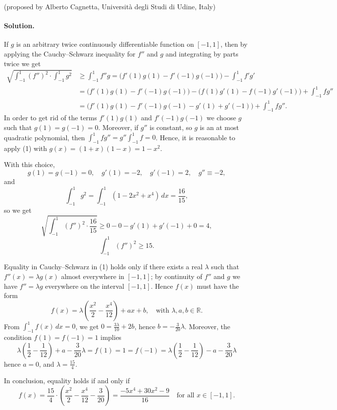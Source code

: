 \documentclass{article}
\begin{document}
(proposed by Alberto Cagnetta, Universit\`a degli Studi di Udine, Italy)

\paragraph{Solution.}
If $g$ is an arbitrary twice continuously differentiable function on $[-1,1]$, then by applying the Cauchy--Schwarz inequality for $f''$ and $g$ and integrating by parts twice we get
\begin{align*}
\sqrt{\int_{-1}^{1} (f'')^2 \cdot \int_{-1}^{1} g^2} &\geq \int_{-1}^{1} f'' g = \bigl(f'(1)g(1) - f'(-1)g(-1)\bigr) - \int_{-1}^{1} f' g' \\
&= \bigl(f'(1)g(1) - f'(-1)g(-1)\bigr) - \bigl(f(1)g'(1) - f(-1)g'(-1)\bigr) + \int_{-1}^{1} f g'' \\
&= \bigl(f'(1)g(1) - f'(-1)g(-1) - g'(1) + g'(-1)\bigr) + \int_{-1}^{1} f g''. \tag{1}
\end{align*}
In order to get rid of the terms $f'(1)g(1)$ and $f'(-1)g(-1)$ we choose $g$ such that $g(1) = g(-1) = 0$. Moreover, if $g''$ is constant, so $g$ is an at most quadratic polynomial, then $\int_{-1}^{1} f g'' = g'' \int_{-1}^{1} f = 0$.
Hence, it is reasonable to apply (1) with $g(x) = (1+x)(1-x) = 1 - x^2$.

With this choice,
\[
g(1) = g(-1) = 0, \quad g'(1) = -2, \quad g'(-1) = 2, \quad g'' \equiv -2,
\]
and
\[
\int_{-1}^{1} g^2 = \int_{-1}^{1} (1 - 2x^2 + x^4)\, dx = \frac{16}{15},
\]
so we get
\[
\sqrt{\int_{-1}^{1} (f'')^2 \cdot \frac{16}{15}} \geq 0 - 0 - g'(1) + g'(-1) + 0 = 4,
\]
\[
\int_{-1}^{1} (f'')^2 \geq 15.
\]

Equality in Cauchy--Schwarz in (1) holds only if there exists a real $\lambda$ such that $f''(x) = \lambda g(x)$ almost everywhere in $[-1,1]$; by continuity of $f''$ and $g$ we have $f'' = \lambda g$ everywhere on the interval $[-1,1]$. Hence $f(x)$ must have the form
\[
f(x) = \lambda\left(\frac{x^2}{2} - \frac{x^4}{12}\right) + ax + b, \quad \text{with } \lambda, a, b \in \mathbb{R}.
\]
From $\int_{-1}^{1} f(x)\,dx = 0$, we get $0 = \frac{3\lambda}{10} + 2b$, hence $b = -\frac{3}{20}\lambda$. Moreover, the condition $f(1) = f(-1) = 1$ implies
\[
\lambda\left(\frac{1}{2} - \frac{1}{12}\right) + a - \frac{3}{20}\lambda = f(1) = 1 = f(-1) = \lambda\left(\frac{1}{2} - \frac{1}{12}\right) - a - \frac{3}{20}\lambda
\]
hence $a = 0$, and $\lambda = \frac{15}{4}$.

In conclusion, equality holds if and only if
\[
f(x) = \frac{15}{4}\cdot\left(\frac{x^2}{2} - \frac{x^4}{12} - \frac{3}{20}\right) = \frac{-5x^4 + 30x^2 - 9}{16} \quad \text{for all } x \in [-1,1].
\]
\end{document}
